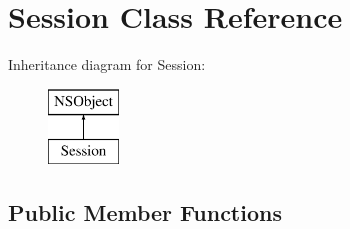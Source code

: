 \hypertarget{interface_session}{
\section{\-Session \-Class \-Reference}
\label{interface_session}
}
\-Inheritance diagram for \-Session\-:\begin{figure}[H]
\begin{center}
\leavevmode
\includegraphics[height=2.000000cm]{interface_session}
\end{center}
\end{figure}
\subsection*{\-Public \-Member \-Functions}
